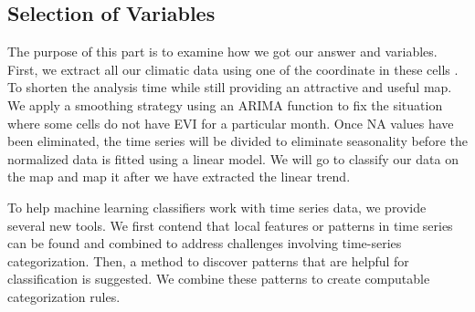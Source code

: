 \subsection{Selection of Variables}
The purpose of this part is to examine how we got our answer and variables. First, we extract all our climatic data using one of the coordinate in these cells . 
To shorten the analysis time while still providing an attractive and useful map. We apply a smoothing strategy using an ARIMA function to fix the situation where some cells do not have EVI for a particular month. Once NA values have been eliminated, the time series will be divided to eliminate seasonality before the normalized data is fitted using a linear model. We will go to classify our data on the map and map it after we have extracted the linear trend.

To help machine learning classifiers work with time series data, we provide several new tools. We first contend that local features or patterns in time series can be found and combined to address challenges involving time-series categorization. Then, a method to discover patterns that are helpful for classification is suggested. We combine these patterns to create computable categorization rules.
 
